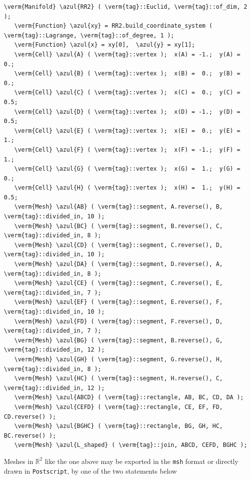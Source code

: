 \begin{Verbatim}[commandchars=\\\{\},formatcom=\small\tt,frame=single,
   label=parag-\ref{\numb section 1.\numb parag 3}.cpp,rulecolor=\color{coment},
   baselinestretch=0.94,framesep=2mm]
   \verm{Manifold} \azul{RR2} ( \verm{tag}::Euclid, \verm{tag}::of_dim, 2 );
   \verm{Function} \azul{xy} = RR2.build_coordinate_system ( \verm{tag}::Lagrange, \verm{tag}::of_degree, 1 );
   \verm{Function} \azul{x} = xy[0],  \azul{y} = xy[1];
   \verm{Cell} \azul{A} ( \verm{tag}::vertex );  x(A) = -1.;  y(A) = 0.;
   \verm{Cell} \azul{B} ( \verm{tag}::vertex );  x(B) =  0.;  y(B) = 0.;
   \verm{Cell} \azul{C} ( \verm{tag}::vertex );  x(C) =  0.;  y(C) = 0.5;
   \verm{Cell} \azul{D} ( \verm{tag}::vertex );  x(D) = -1.;  y(D) = 0.5;
   \verm{Cell} \azul{E} ( \verm{tag}::vertex );  x(E) =  0.;  y(E) = 1.;
   \verm{Cell} \azul{F} ( \verm{tag}::vertex );  x(F) = -1.;  y(F) = 1.;
   \verm{Cell} \azul{G} ( \verm{tag}::vertex );  x(G) =  1.;  y(G) = 0.;
   \verm{Cell} \azul{H} ( \verm{tag}::vertex );  x(H) =  1.;  y(H) = 0.5;
   \verm{Mesh} \azul{AB} ( \verm{tag}::segment, A.reverse(), B, \verm{tag}::divided_in, 10 );
   \verm{Mesh} \azul{BC} ( \verm{tag}::segment, B.reverse(), C, \verm{tag}::divided_in, 8 );
   \verm{Mesh} \azul{CD} ( \verm{tag}::segment, C.reverse(), D, \verm{tag}::divided_in, 10 );
   \verm{Mesh} \azul{DA} ( \verm{tag}::segment, D.reverse(), A, \verm{tag}::divided_in, 8 );
   \verm{Mesh} \azul{CE} ( \verm{tag}::segment, C.reverse(), E, \verm{tag}::divided_in, 7 );
   \verm{Mesh} \azul{EF} ( \verm{tag}::segment, E.reverse(), F, \verm{tag}::divided_in, 10 );
   \verm{Mesh} \azul{FD} ( \verm{tag}::segment, F.reverse(), D, \verm{tag}::divided_in, 7 );
   \verm{Mesh} \azul{BG} ( \verm{tag}::segment, B.reverse(), G, \verm{tag}::divided_in, 12 );
   \verm{Mesh} \azul{GH} ( \verm{tag}::segment, G.reverse(), H, \verm{tag}::divided_in, 8 );
   \verm{Mesh} \azul{HC} ( \verm{tag}::segment, H.reverse(), C, \verm{tag}::divided_in, 12 );
   \verm{Mesh} \azul{ABCD} ( \verm{tag}::rectangle, AB, BC, CD, DA );
   \verm{Mesh} \azul{CEFD} ( \verm{tag}::rectangle, CE, EF, FD, CD.reverse() );
   \verm{Mesh} \azul{BGHC} ( \verm{tag}::rectangle, BG, GH, HC, BC.reverse() );
   \verm{Mesh} \azul{L_shaped} ( \verm{tag}::join, ABCD, CEFD, BGHC );
\end{Verbatim}

Meshes in $ \mathbb{R}^2 $ like the one above may be exported in the {\small\tt msh} format
or directly drawn in {\small\tt Postscript}, by one of the two statements below

